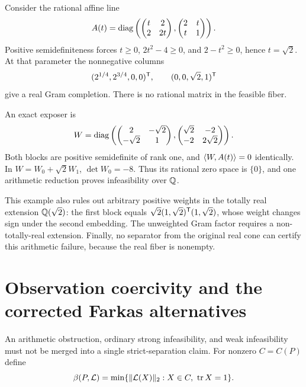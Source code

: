 \begin{example}\label{ex:arithmetic}
Consider the rational affine line
\[
 A(t)=\operatorname{diag}\left(\begin{pmatrix}t&2\\2&2t\end{pmatrix},\begin{pmatrix}2&t\\t&1\end{pmatrix}\right).
\]
Positive semidefiniteness forces $t\ge0$, $2t^2-4\ge0$, and $2-t^2\ge0$, hence $t=\sqrt2$. At that parameter the nonnegative columns
\[
 (2^{1/4},2^{3/4},0,0)^{\mathsf T},\qquad(0,0,\sqrt2,1)^{\mathsf T}
\]
give a real Gram completion. There is no rational matrix in the feasible fiber.

An exact exposer is
\[
 W=\operatorname{diag}\left(\begin{pmatrix}2&-\sqrt2\\-\sqrt2&1\end{pmatrix},
 \begin{pmatrix}\sqrt2&-2\\-2&2\sqrt2\end{pmatrix}\right).
\]
Both blocks are positive semidefinite of rank one, and $\langle W,A(t)\rangle=0$ identically. In $W=W_0+\sqrt2W_1$, $\det W_0=-8$. Thus its rational zero space is $\{0\}$, and one arithmetic reduction proves infeasibility over $\mathbb Q$.

This example also rules out arbitrary positive weights in the totally real extension $\mathbb Q(\sqrt2)$: the first block equals $\sqrt2(1,\sqrt2)^{\mathsf T}(1,\sqrt2)$, whose weight changes sign under the second embedding. The unweighted Gram factor requires a non-totally-real extension. Finally, no separator from the original real cone can certify this arithmetic failure, because the real fiber is nonempty.
\end{example}

\section{Observation coercivity and the corrected Farkas alternatives}\label{sec:observation}
An arithmetic obstruction, ordinary strong infeasibility, and weak infeasibility must not be merged into a single strict-separation claim. For nonzero $C=C(P)$ define
\begin{equation}\label{eq:beta}
 \beta(P,\mathcal L)=\min\{\lVert \mathcal L(X)\rVert_2:X\in C,\ \operatorname{tr} X=1\}.
\end{equation}

